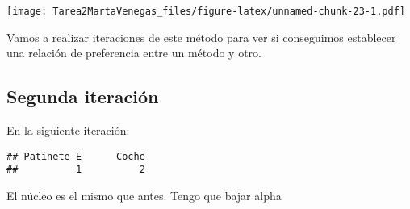 \documentclass[
]{article}
\newenvironment{Shaded}{\begin{snugshade}}{\end{snugshade}}
\newcommand{\AttributeTok}[1]{\textcolor[rgb]{0.77,0.63,0.00}{#1}}
\newcommand{\ConstantTok}[1]{\textcolor[rgb]{0.00,0.00,0.00}{#1}}
\newcommand{\DecValTok}[1]{\textcolor[rgb]{0.00,0.00,0.81}{#1}}
\newcommand{\FloatTok}[1]{\textcolor[rgb]{0.00,0.00,0.81}{#1}}
\newcommand{\FunctionTok}[1]{\textcolor[rgb]{0.00,0.00,0.00}{#1}}
\newcommand{\NormalTok}[1]{#1}
\newcommand{\OtherTok}[1]{\textcolor[rgb]{0.56,0.35,0.01}{#1}}
\newcommand{\SpecialCharTok}[1]{\textcolor[rgb]{0.00,0.00,0.00}{#1}}
\begin{document}
\begin{Shaded}
\end{Shaded}

\texttt{[image: Tarea2MartaVenegas\_files/figure-latex/unnamed-chunk-23-1.pdf]}

Vamos a realizar iteraciones de este método para ver si conseguimos
establecer una relación de preferencia entre un método y otro.

\hypertarget{segunda-iteraciuxf3n}{%
\subsection{Segunda iteración}\label{segunda-iteraciuxf3n}}

En la siguiente iteración:

\begin{Shaded}
\end{Shaded}

\begin{verbatim}
## Patinete E      Coche 
##          1          2
\end{verbatim}

El núcleo es el mismo que antes. Tengo que bajar alpha

\begin{Shaded}
\end{Shaded}
\end{document}

